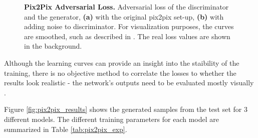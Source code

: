 \documentclass[12pt]{report}
\begin{document}
\begin{figure}[t]
\centering
{}
\caption{\label{fig:pix2pix_losses} \textbf{Pix2Pix Adversarial Loss.} Adversarial loss of the discriminator and the generator, \textbf{(a)} with the original pix2pix set-up, \textbf{(b)} with adding noise to discriminator. For visualization purposes, the curves are smoothed, such as described in \cite{noauthor_tensorflows_2018}. The real loss values are shown in the background.}
\end{figure}

Although the learning curves can provide an insight into the staibility of the training, there is no objective method to correlate the losses to whether the results look realistic - the network's outputs need to be evaluated mostly visually \cite{preserve_knowledge_how_nodate}. 

Figure \ref{fig:pix2pix_results} shows the generated samples from the test set for 3 different models. The different training parameters for each model are summarized in Table \ref{tab:pix2pix_exp}. 
\end{document}
